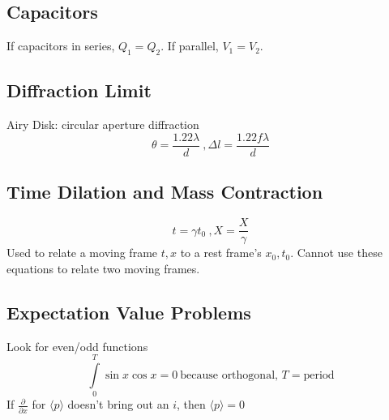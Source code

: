 \documentclass[10pt,letter]{article}
\begin{document}
\subsection{Capacitors}
If capacitors in series, $Q_1 = Q_2$. If parallel, $V_1 = V_2$.

\subsection{Diffraction Limit}
Airy Disk: circular aperture diffraction
\begin{equation}
 \theta = \frac{1.22 \lambda}{d}~, \Delta l = \frac{1.22 f\lambda}{d}
\end{equation}

\subsection{Time Dilation and Mass Contraction}
\begin{equation}
 t=\gamma t_0~,X = \frac{X}{\gamma} 
\end{equation}
Used to relate a moving frame $t,x$ to a rest frame's $x_0,t_0$. Cannot use these equations to relate two moving frames.

\subsection{Expectation Value Problems}
Look for even/odd functions
\begin{equation}
 \int \limits_0^T \sin x \cos x = 0~ \textrm{because orthogonal, }T= \textrm{period}
\end{equation}
If $\frac{\partial}{\partial x}$ for $ \langle p \rangle$ doesn't bring out an $i$, then $\langle p \rangle = 0$
\end{document}
